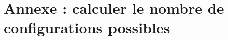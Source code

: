\documentclass[a4,11pt]{article}
\begin{document}
\hspace{1cm}

\clearpage

%
%
%
%
%
%
%
%
%
%    
%
%
%    
%
%
%    
%
%
%    


%    	
%
%


\section{Annexe : calculer le nombre de configurations possibles}    %
    
\end{document}
